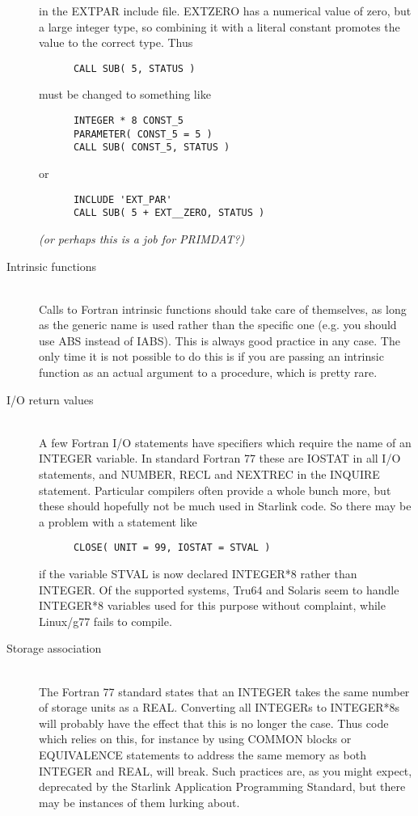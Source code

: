\documentclass[twoside,11pt]{article}
\newcommand{\xref}[3]{#1}
\renewcommand{\_}{\texttt{\symbol{95}}}
\begin{document}
\begin{description}
in the EXT\_PAR include file.  EXT\_\_ZERO has a numerical value of 
zero, but a large integer type, so combining it with
a literal constant promotes the value to the correct type.
Thus
\begin{squote}
\begin{verbatim}
      CALL SUB( 5, STATUS )
\end{verbatim}
\end{squote}
must be changed to something like
\begin{squote}
\begin{verbatim}
      INTEGER * 8 CONST_5
      PARAMETER( CONST_5 = 5 )
      CALL SUB( CONST_5, STATUS )
\end{verbatim}
\end{squote}
or
\begin{squote}
\begin{verbatim}
      INCLUDE 'EXT_PAR'
      CALL SUB( 5 + EXT__ZERO, STATUS )
\end{verbatim}
\end{squote}
{\it (or perhaps this is a job for PRIMDAT?)}
%
\item[Intrinsic functions]\mbox{}
\\
Calls to Fortran intrinsic functions should take care of themselves,
as long as the generic name is used rather than the specific one
(e.g. you should use ABS instead of IABS).  This is always good
practice in any case.  The only time it is not possible to do 
this is if you are passing an intrinsic function as an actual
argument to a procedure, which is pretty rare.
%
\item[I/O return values]\mbox{}
\\
A few Fortran I/O statements have specifiers which require the name
of an INTEGER variable.  In standard Fortran 77 these are 
IOSTAT in all I/O statements, and 
NUMBER, RECL and NEXTREC in the INQUIRE statement.
Particular compilers often provide a whole bunch more, but these
should hopefully not be much used in Starlink code.
So there may be a problem with a statement like
\begin{squote}
\begin{verbatim}
      CLOSE( UNIT = 99, IOSTAT = STVAL )
\end{verbatim}
\end{squote}
if the variable STVAL is now declared INTEGER*8 rather than INTEGER.
Of the supported systems, Tru64 and Solaris seem to handle 
INTEGER*8 variables used for this purpose without complaint,
while Linux/g77 fails to compile.
%
\item[Storage association]\mbox{}
\\
The Fortran 77 standard states that an INTEGER takes the same number of
storage units as a REAL.  Converting all INTEGERs to INTEGER*8s will
probably have the effect that this is no longer the case.
Thus code which relies on this, for instance by using COMMON blocks or
EQUIVALENCE statements to address the same memory as both INTEGER and REAL,
will break.  
Such practices are, as you might expect, deprecated by the 
\xref{Starlink Application Programming Standard}{sgp16}{},
but there may be instances of them lurking about.
%
\end{description}
\end{document}
